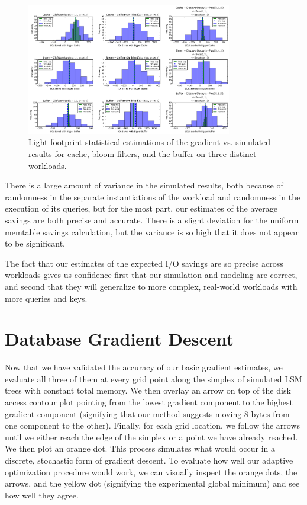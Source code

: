 \documentclass{sig-alternate-05-2015}
\begin{document}
\begin{figure}[!h]
\begin{center}
\includegraphics[width=0.8\textwidth]{all-savings.png}
\end{center}
\caption{Light-footprint statistical estimations of the gradient vs. simulated
results for cache, bloom filters, and the buffer on three distinct workloads.}
\label{fig:savings}
\end{figure}

There is a large amount of variance in the simulated results, both because of
randomness in the separate instantiations of the workload and randomness in
the execution of its queries, but for the most part, our estimates of the average
savings are both precise and accurate. There is a slight deviation for the uniform
memtable savings calculation, but the variance is so high that it does not appear
to be significant.

The fact that our estimates of the expected I/O savings are so precise across
workloads gives us confidence first that our simulation and modeling are correct,
and second that they will generalize to more complex, real-world workloads
with more queries and keys.

\section{Database Gradient Descent}

Now that we have validated the accuracy of our basic gradient estimates, we
evaluate all three of them at every grid point along the simplex of simulated
LSM trees with constant total memory. We then overlay an arrow on top of the
disk access contour plot pointing from the lowest gradient component to the
highest gradient component (signifying that our method suggests moving 8 bytes
from one component to the other). Finally, for each grid location, we follow
the arrows until we either reach the edge of the simplex or a point we have
already reached.  We then plot an orange dot. This process simulates what would
occur in a discrete, stochastic form of gradient descent. To evaluate how well
our adaptive optimization procedure would work, we can visually inspect the
orange dots, the arrows, and the yellow dot (signifying the experimental global
minimum) and see how well they agree.
\end{document}

